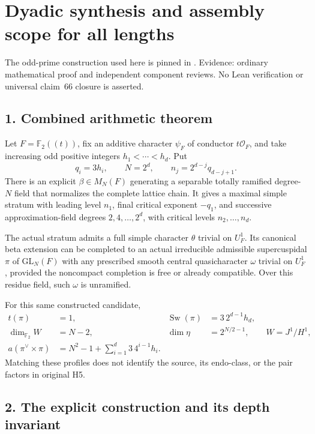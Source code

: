 \clearpage
\section{Dyadic synthesis and assembly scope for all lengths}\label{app:dyadic_synthesis}

The odd-prime construction used here is pinned in
. Evidence: ordinary mathematical proof and
independent component reviews. No Lean verification or universal claim~66
closure is asserted.

\hypertarget{dyadic_synthesis-combined-arithmetic-theorem}{%
\subsection{1. Combined arithmetic
theorem}\label{dyadic_synthesis-combined-arithmetic-theorem}}

Let \(F=\mathbb F_2((t))\), fix an additive character \(\psi_F\) of
conductor \(t\mathcal O_F\), and take increasing odd positive integers
\(h_1<\cdots<h_d\). Put \[
q_i=3h_i,\qquad N=2^d,\qquad n_j=2^{d-j}q_{d-j+1}.
\] There is an explicit \(\beta\in M_N(F)\) generating a separable
totally ramified degree-\(N\) field that normalizes the complete lattice
chain. It gives a maximal simple stratum with leading level \(n_1\),
final critical exponent \(-q_1\), and successive approximation-field
degrees \(2,4,\ldots,2^d\), with critical levels \(n_2,\ldots,n_d\).

The actual stratum admits a full simple character \(\theta\) trivial on
\(U_F^1\). Its canonical beta extension can be completed to an actual
irreducible admissible supercuspidal \(\pi\) of \(\mathrm{GL}_N(F)\)
with any prescribed smooth central quasicharacter \(\omega\) trivial on
\(U_F^1\), provided the noncompact completion is free or already
compatible. Over this residue field, such \(\omega\) is unramified.

For this same constructed candidate, \[
\begin{aligned}
t(\pi)&=1,& \operatorname{Sw}(\pi)&=3\,2^{d-1}h_d,\\
\dim_{\mathbb F_2}W&=N-2,&
\dim\eta&=2^{N/2-1},\qquad W=J^1/H^1,\\
a(\pi^\vee\times\pi)
 &=N^2-1+\sum_{i=1}^d3\,4^{i-1}h_i.
\end{aligned}
\] Matching these profiles does not identify the source, its endo-class,
or the pair factors in original H5.

\hypertarget{dyadic_synthesis-the-explicit-construction-and-its-depth-invariant}{%
\subsection{2. The explicit construction and its depth
invariant}\label{dyadic_synthesis-the-explicit-construction-and-its-depth-invariant}}

